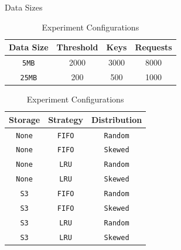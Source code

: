 \begin{table}[h]
\begin{center}
\caption{Data Sizes}
\label{tab:data_types}
\begin{tabular}{|c|c|c|c|}
  \hline
  Data Size & Threshold & Keys & Requests\\
  \hline
  {\tt 5MB}& 2000 & 3000 & 8000\\
  {\tt 25MB} & 200 & 500 & 1000\\
  \hline
\end{tabular}

\caption{Experiment Configurations}
\label{tab:experiment_configurations}
\begin{tabular}{|c|c|c|}
    \hline
    Storage&Strategy&Distribution\\
    \hline
    {\tt None}&{\tt FIFO}&{\tt Random}\\
    {\tt None}&{\tt FIFO}&{\tt Skewed}\\
    {\tt None}&{\tt LRU} &{\tt Random}\\
    {\tt None}&{\tt LRU} &{\tt Skewed}\\
    \hline
    {\tt S3}&{\tt FIFO}&{\tt Random}\\
    {\tt S3}&{\tt FIFO}&{\tt Skewed}\\
    {\tt S3}&{\tt LRU}&{\tt Random}\\
    {\tt S3}&{\tt LRU}&{\tt Skewed}\\
    \hline
\end{tabular}
\end{center}
\end{table}


